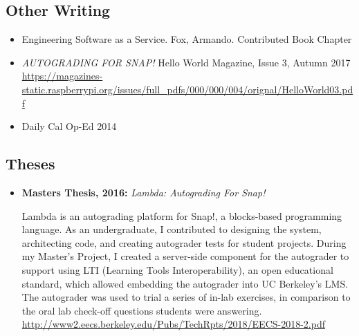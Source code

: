 \vspace{6pt}

\subsection{Other Writing}

\vspace{5pt}

\begin{itemize}

    \setlength\itemsep{1em}
    
    \item Engineering Software as a Service. Fox, Armando. Contributed Book Chapter

    \item{\textit{AUTOGRADING FOR SNAP!} Hello World Magazine, Issue 3, Autumn 2017}
    \newline
    \small{\href{https://magazines-static.raspberrypi.org/issues/full\_pdfs/000/000/004/orignal/HelloWorld03.pdf}{https://magazines-static.raspberrypi.org/issues/full\_pdfs/000/000/004/orignal/HelloWorld03.pdf}}
    
    \item{Daily Cal Op-Ed 2014}

\end{itemize}


\subsection{Theses}

\vspace{5pt}

\begin{itemize}

  \setlength\itemsep{1em}
  
  \item \textbf{Masters Thesis, 2016:} \textit{Lambda: Autograding For Snap!}

    \small{Lambda is an autograding platform for Snap!, a blocks-based programming language. As an undergraduate, I contributed to designing the system, architecting code, and creating autograder tests for student projects. During my Master's Project, I created a server-side component for the autograder to support using LTI (Learning Tools Interoperability), an open educational standard, which allowed embedding the autograder into UC Berkeley's LMS. The autograder was used to trial a series of in-lab exercises, in comparison to the oral lab check-off questions students were answering.}
    \linebreak
    \small{\href{http://www2.eecs.berkeley.edu/Pubs/TechRpts/2018/EECS-2018-2.pdf}{http://www2.eecs.berkeley.edu/Pubs/TechRpts/2018/EECS-2018-2.pdf}}

\end{itemize}

\vspace{2pt}